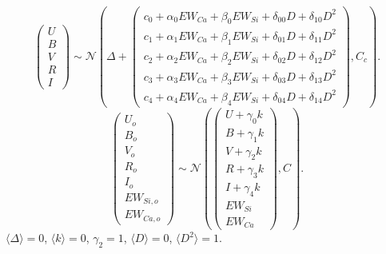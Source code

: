 \documentclass[11pt, oneside]{article}   	%
\begin{document}
\begin{equation*}
\left(
\begin{matrix}
U\\B\\V\\R\\I
\end{matrix}
\right) \sim \mathcal{N}
\left(
\Delta +
\left(
\begin{matrix}
c_0+\alpha_0 EW_{Ca} + \beta_0 EW_{Si} +\delta_{00} D +\delta_{10} D^2\\
c_1+\alpha_1 EW_{Ca} + \beta_1 EW_{Si} +\delta_{01} D  +\delta_{11} D^2\\
c_2+\alpha_2 EW_{Ca} + \beta_2 EW_{Si} +\delta_{02} D +\delta_{12} D^2\\
c_3+\alpha_3 EW_{Ca} + \beta_3 EW_{Si} +\delta_{03} D +\delta_{13} D^2\\
c_4+\alpha_4 EW_{Ca} + \beta_4 EW_{Si}+\delta_{04} D +\delta_{14} D^2
\end{matrix}
\right)
,C_{c}
\right).
\end{equation*}
\begin{equation*}
\left(
\begin{matrix}
U_o\\B_o\\ V_o\\R_o\\I_o\\EW_{Si, o}\\ EW_{Ca, o}
\end{matrix}
\right) \sim \mathcal{N}
\left(
\left(
\begin{matrix}
U +\gamma_0 k \\B +\gamma_1 k \\V+\gamma_2 k\\R+\gamma_3 k\\I+\gamma_4 k\\
EW_{Si}\\ EW_{Ca}
\end{matrix}
\right)
,C
\right).
\end{equation*}
$\langle \Delta \rangle=0$, $\langle k \rangle=0$, $\gamma_2=1$, $\langle D \rangle=0$, $\langle D^2 \rangle=1$.
\end{document}
